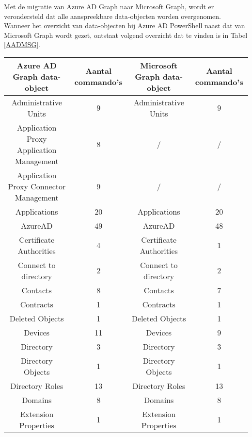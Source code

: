 

Met de migratie van Azure \ac{AD} Graph naar Microsoft Graph, wordt er verondersteld dat alle aanspreekbare data-objecten worden overgenomen. Wanneer het overzicht van data-objecten bij Azure \ac{AD} PowerShell naast dat van Microsoft Graph wordt gezet, ontstaat volgend overzicht dat te vinden is in Tabel \ref{AADMSG}. \\

\begin{table}
    \centering
    \begin{adjustbox}{max width=\textwidth}
    \begin{tabular}{ |c|c||c|c| } 
        \hline
        \textbf{Azure AD Graph data-object} & \textbf{Aantal commando's} & \textbf{Microsoft Graph data-object} & \textbf{Aantal commando's} \\
        \hline
        Administrative Units & 9 & Administrative Units & 9 \\ 
        Application Proxy Application Management & 8 & / & / \\
        Application Proxy Connector Management & 9 & / & / \\
        Applications & 20 & Applications & 20 \\ 
        AzureAD & 49 & AzureAD & 48 \\ 
        Certificate Authorities & 4 & Certificate Authorities & 1 \\ 
        Connect to directory & 2 & Connect to directory & 2 \\ 
        Contacts & 8 & Contacts & 7 \\ 
        Contracts & 1 & Contracts & 1 \\ 
        Deleted Objects & 1 & Deleted Objects & 1 \\ 
        Devices & 11 & Devices & 9 \\    
        Directory & 3 & Directory & 3 \\
        Directory Objects & 1 & Directory Objects & 1 \\ 
        Directory Roles & 13 & Directory Roles & 13 \\ 
        Domains & 8 & Domains & 8 \\ 
        Extension Properties & 1 & Extension Properties & 1 \\ 

\end{tabular}
\end{adjustbox}
\end{table}
